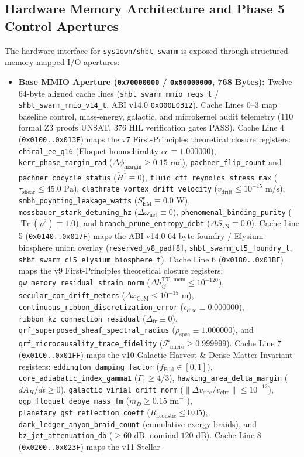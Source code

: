 \documentclass[11pt,onecolumn]{article}
\begin{document}
\subsection{Hardware Memory Architecture and Phase 5 Control Apertures}
The hardware interface for \texttt{sys1own/shbt-swarm} is exposed through structured memory-mapped I/O apertures:
\begin{itemize}
    \item \textbf{Base MMIO Aperture (\texttt{0x70000000} / \texttt{0x80000000}, 768 Bytes):} Twelve 64-byte aligned cache lines (\texttt{shbt\_swarm\_mmio\_regs\_t} / \texttt{shbt\_swarm\_mmio\_v14\_t}, ABI v14.0 \texttt{0x000E0312}). Cache Lines 0--3 map baseline control, mass-energy, galactic, and microkernel audit telemetry (110 formal Z3 proofs UNSAT, 376 HIL verification gates PASS). Cache Line 4 (\texttt{0x0100..0x013F}) maps the v7 First-Principles theoretical closure registers: \texttt{chiral\_ee\_q16} (Floquet homochirality $ee \equiv 1.000000$), \texttt{kerr\_phase\_margin\_rad} ($\Delta\phi_{\mathrm{margin}} \ge 0.15\text{ rad}$), \texttt{pachner\_flip\_count} and \texttt{pachner\_cocycle\_status} ($\check{H}^1 \equiv 0$), \texttt{fluid\_cft\_reynolds\_stress\_max} ($\tau_{\mathrm{shear}} \le 45.0\text{ Pa}$), \texttt{clathrate\_vortex\_drift\_velocity} ($v_{\mathrm{drift}} \le 10^{-15}\text{ m/s}$), \texttt{smbh\_poynting\_leakage\_watts} ($S_{\mathrm{EM}}^r \equiv 0.0\text{ W}$), \texttt{mossbauer\_stark\_detuning\_hz} ($\Delta\omega_{\mathrm{net}} \equiv 0$), \texttt{phenomenal\_binding\_purity} ($\operatorname{Tr}(\rho^2) \equiv 1.0$), and \texttt{branch\_prune\_entropy\_debt} ($\Delta S_{\mathrm{vN}} \equiv 0.0$). Cache Line 5 (\texttt{0x0140..0x017F}) maps the ABI v14.0 64-byte foundry / Elysium-biosphere union overlay (\texttt{reserved\_v8\_pad[8]}, \texttt{shbt\_swarm\_cl5\_foundry\_t}, \texttt{shbt\_swarm\_cl5\_elysium\_biosphere\_t}). Cache Line 6 (\texttt{0x0180..0x01BF}) maps the v9 First-Principles theoretical closure registers: \texttt{gw\_memory\_residual\_strain\_norm} ($\Delta h_{ij}^{\text{TT, mem}} \le 10^{-120}$), \texttt{secular\_com\_drift\_meters} ($\Delta x_{\text{CoM}} \le 10^{-15}\text{ m}$), \texttt{continuous\_ribbon\_discretization\_error} ($\epsilon_{\text{disc}} \equiv 0.000000$), \texttt{ribbon\_kz\_connection\_residual} ($\Delta_{\text{fr}} \equiv 0$), \texttt{qrf\_superposed\_sheaf\_spectral\_radius} ($\rho_{\text{spec}} \equiv 1.000000$), and \texttt{qrf\_microcausality\_trace\_fidelity} ($\mathcal{F}_{\text{micro}} \ge 0.999999$). Cache Line 7 (\texttt{0x01C0..0x01FF}) maps the v10 Galactic Harvest \& Dense Matter Invariant registers: \texttt{eddington\_damping\_factor} ($f_{\text{Edd}} \in [0, 1]$), \texttt{core\_adiabatic\_index\_gamma1} ($\Gamma_1 \ge 4/3$), \texttt{hawking\_area\_delta\_margin} ($dA_H / dt \ge 0$), \texttt{galactic\_virial\_drift\_norm} ($\|\Delta v_{\text{circ}} / v_{\text{circ}}\| \le 10^{-12}$), \texttt{qgp\_floquet\_debye\_mass\_fm} ($m_D \ge 0.15\text{ fm}^{-1}$), \texttt{planetary\_gst\_reflection\_coeff} ($R_{\text{acoustic}} \le 0.05$), \texttt{dark\_ledger\_anyon\_braid\_count} (cumulative exergy braids), and \texttt{bz\_jet\_attenuation\_db} ($\ge 60\text{ dB}$, nominal $120\text{ dB}$). Cache Line 8 (\texttt{0x0200..0x023F}) maps the v11 Stellar 
\end{itemize}
\end{document}
